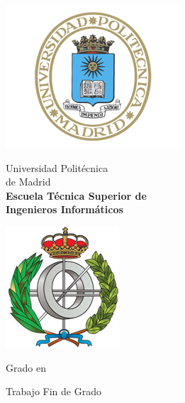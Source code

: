 \begin{titlepage}

  \begin{minipage}{0.15\linewidth}
    \hspace*{-2.5cm}
    \noindent
    \includegraphics[scale=0.5]{./include/EscUpm.png} \qquad\qquad
  \end{minipage}
  \begin{minipage}{0.7\linewidth}
    \begin{center}
      \huge{ Universidad Politécnica\\de Madrid }\\
      \vspace*{0.5cm}
      \Large{\textbf{Escuela Técnica Superior de \\Ingenieros Informáticos}}
    \end{center}
  \end{minipage}
  \begin{minipage}{0.2\linewidth}
    \includegraphics[scale=0.5]{./include/FacInformatica.png}
  \end{minipage}

  \vspace*{1cm}
  \begin{center}
    \Large{Grado en  \Grado{} }
  \end{center}

  \vspace*{1cm}
  \begin{center}
    \huge{Trabajo Fin de Grado}
  \end{center}


\end{titlepage}
